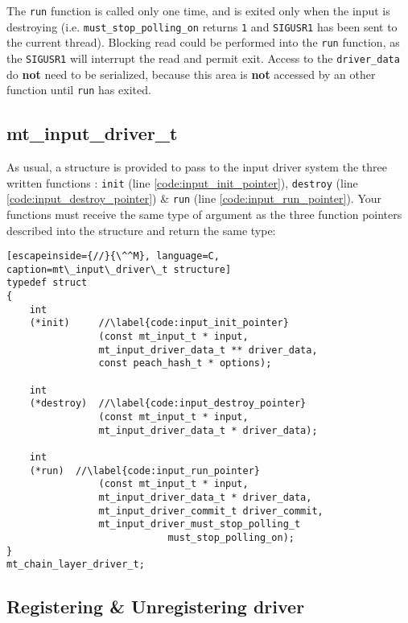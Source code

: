 The \texttt{run} function is called only one time, and is exited only when
the input is destroying (i.e. \texttt{must\_stop\_polling\_on} returns \texttt{1}
and \texttt{SIGUSR1} has been sent to the current thread).
Blocking read could be performed into the \texttt{run} function, as the 
\texttt{SIGUSR1} will interrupt the read and permit exit.
Access to the \texttt{driver\_data} do \textbf{not} need to be serialized, 
because this area is \textbf{not} accessed by an other function until
\texttt{run} has exited.


%
%
\subsection{mt\_input\_driver\_t}
\label{sect:input_input_driver_t}
As usual, a structure is provided to pass to the input driver system the
three written functions : \texttt{init}
(line \ref{code:input_init_pointer}), 
\texttt{destroy} (line \ref{code:input_destroy_pointer}) \& 
\texttt{run} (line \ref{code:input_run_pointer}). Your functions 
must receive the same type of argument as the three function pointers 
described into the structure and return the same type:
\begin{lstlisting}[escapeinside={//}{\^^M}, language=C,
caption=mt\_input\_driver\_t structure]
typedef struct 
{
    int 
    (*init)     //\label{code:input_init_pointer}
                (const mt_input_t * input,
                mt_input_driver_data_t ** driver_data, 
                const peach_hash_t * options);

    int 
    (*destroy)  //\label{code:input_destroy_pointer}
                (const mt_input_t * input,
                mt_input_driver_data_t * driver_data);

    int
    (*run)  //\label{code:input_run_pointer}
                (const mt_input_t * input,
                mt_input_driver_data_t * driver_data,
                mt_input_driver_commit_t driver_commit,
                mt_input_driver_must_stop_polling_t
                            must_stop_polling_on);
}
mt_chain_layer_driver_t;
\end{lstlisting}

%
%
\subsection{Registering \& Unregistering driver}
\label{sect:input_driver_register}
\label{sect:input_driver_unregister}

